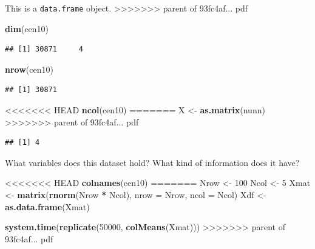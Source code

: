 \documentclass[]{book}
\newenvironment{Shaded}{\begin{snugshade}}{\end{snugshade}}
\newcommand{\DataTypeTok}[1]{\textcolor[rgb]{0.13,0.29,0.53}{#1}}
\newcommand{\DecValTok}[1]{\textcolor[rgb]{0.00,0.00,0.81}{#1}}
\newcommand{\KeywordTok}[1]{\textcolor[rgb]{0.13,0.29,0.53}{\textbf{#1}}}
\newcommand{\NormalTok}[1]{#1}
\newcommand{\OperatorTok}[1]{\textcolor[rgb]{0.81,0.36,0.00}{\textbf{#1}}}
\newcommand{\StringTok}[1]{\textcolor[rgb]{0.31,0.60,0.02}{#1}}
\theoremstyle{definition}
\theoremstyle{definition}
\theoremstyle{definition}
\theoremstyle{remark}
\begin{document}
\begin{Shaded}
\begin{Highlighting}[]
\begin{Shaded}
\begin{Highlighting}[]
This is a \texttt{data.frame} object.
>>>>>>> parent of 93fc4af... pdf

\begin{Shaded}
\begin{Highlighting}[]
\KeywordTok{dim}\NormalTok{(cen10)}
\end{Highlighting}
\end{Shaded}

\begin{verbatim}
## [1] 30871     4
\end{verbatim}

\begin{Shaded}
\begin{Highlighting}[]
\KeywordTok{nrow}\NormalTok{(cen10)}
\end{Highlighting}
\end{Shaded}

\begin{verbatim}
## [1] 30871
\end{verbatim}

\begin{Shaded}
\begin{Highlighting}[]
<<<<<<< HEAD
\KeywordTok{ncol}\NormalTok{(cen10)}
=======
\NormalTok{X <-}\StringTok{ }\KeywordTok{as.matrix}\NormalTok{(nunn)}
>>>>>>> parent of 93fc4af... pdf
\end{Highlighting}
\end{Shaded}

\begin{verbatim}
## [1] 4
\end{verbatim}

What variables does this dataset hold? What kind of information does it have?

\begin{Shaded}
\begin{Highlighting}[]
<<<<<<< HEAD
\KeywordTok{colnames}\NormalTok{(cen10)}
=======
\NormalTok{Nrow <-}\StringTok{ }\DecValTok{100}
\NormalTok{Ncol <-}\StringTok{ }\DecValTok{5}
\NormalTok{Xmat <-}\StringTok{ }\KeywordTok{matrix}\NormalTok{(}\KeywordTok{rnorm}\NormalTok{(Nrow }\OperatorTok{*}\StringTok{ }\NormalTok{Ncol), }\DataTypeTok{nrow =}\NormalTok{ Nrow, }\DataTypeTok{ncol =}\NormalTok{ Ncol)}
\NormalTok{Xdf <-}\StringTok{ }\KeywordTok{as.data.frame}\NormalTok{(Xmat)}

\KeywordTok{system.time}\NormalTok{(}\KeywordTok{replicate}\NormalTok{(}\DecValTok{50000}\NormalTok{, }\KeywordTok{colMeans}\NormalTok{(Xmat)))}
>>>>>>> parent of 93fc4af... pdf
\end{Highlighting}
\end{Shaded}


\end{Highlighting}
\end{Shaded}
\end{Highlighting}
\end{Shaded}
\end{document}
